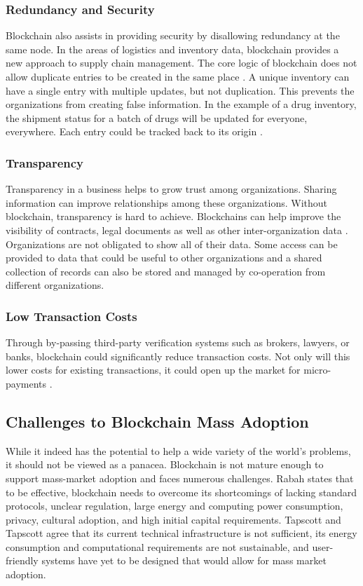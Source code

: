 \documentclass[sigconf]{acmart}
\begin{document}
\subsubsection{Redundancy and Security} Blockchain also assists in providing security by disallowing redundancy at the same node. In the areas of logistics and inventory data, blockchain provides a new approach to supply chain management. The core logic of blockchain does not allow duplicate entries to be created in the same place \cite{arbc4}. A unique inventory can have a single entry with multiple updates, but not duplication. This prevents the organizations from creating false information. In the example of a drug inventory, the shipment status for a batch of drugs will be updated for everyone, everywhere. Each entry could be tracked back to its origin \cite{arbc4}. 

\subsubsection{Transparency} Transparency in a business helps to grow trust among organizations. Sharing information can improve relationships among these organizations. Without blockchain, transparency is hard to achieve. Blockchains can help improve the visibility of contracts, legal documents as well as other inter-organization data \cite{pabc1}. Organizations are not obligated to show all of their data. Some access can be provided to data that could be useful to other organizations and a shared collection of records can also be stored and managed by co-operation from different organizations.

\subsubsection{Low Transaction Costs} Through by-passing third-party verification systems such as brokers, lawyers, or banks, blockchain could significantly reduce transaction costs. Not only will this lower costs for existing transactions, it could open up the market for micro-payments \cite{hbr}. 

\subsection{Challenges to Blockchain Mass Adoption}
While it indeed has the potential to help a wide variety of the world's problems, it should not be viewed as a panacea.  Blockchain is not mature enough to support mass-market adoption and faces numerous challenges. Rabah \cite{rabah2017overview} states that to be effective, blockchain needs to overcome its shortcomings of lacking standard protocols, unclear regulation, large energy and computing power consumption, privacy, cultural adoption, and high initial capital requirements. Tapscott and Tapscott \cite{tapscott} agree that its current technical infrastructure is not sufficient, its energy consumption and computational requirements are not sustainable, and user-friendly systems have yet to be designed that would allow for mass market adoption.
\end{document}
